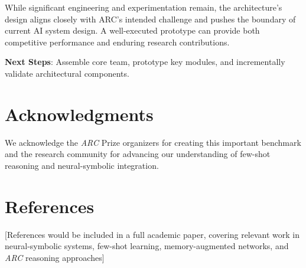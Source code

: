 \documentclass[12pt]{article}
\newcommand{\arc}{\textit{ARC}}
\begin{document}
While significant engineering and experimentation remain, the architecture's design aligns closely with ARC's intended challenge and pushes the boundary of current AI system design. A well-executed prototype can provide both competitive performance and enduring research contributions.

\textbf{Next Steps}: Assemble core team, prototype key modules, and incrementally validate architectural components.

\fi
\section*{Acknowledgments}

We acknowledge the \arc{} Prize organizers for creating this important benchmark and the research community for advancing our understanding of few-shot reasoning and neural-symbolic integration.

\section*{References}

[References would be included in a full academic paper, covering relevant work in neural-symbolic systems, few-shot learning, memory-augmented networks, and \arc{} reasoning approaches]
\end{document}
